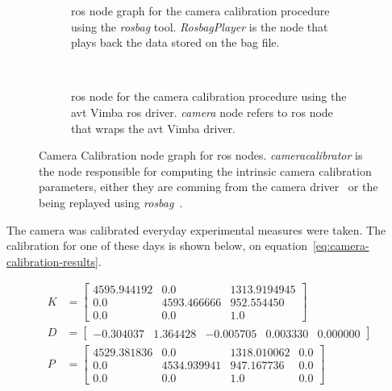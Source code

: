 \begin{figure}[H]
	\vspace{5mm}
	\centering
	\begin{subfigure}[c]{0.8\textwidth}
		\centering
		\def\svgwidth{\columnwidth}
		\graphicspath{{img/camera-calibration/}}
		
		\caption{\ac{ros} node graph for the camera calibration procedure using the \emph{rosbag} tool. \emph{RosbagPlayer} is the node that plays back the data stored on the bag file.}
		\label{fig:camera-calibration-bag-rosgraph}
	\end{subfigure}
	\vspace{5mm} \\ 
	\begin{subfigure}[c]{0.8\textwidth}
		\centering
		\def\svgwidth{\columnwidth}
		\graphicspath{{img/camera-calibration/}}
		
		\caption{\ac{ros} node for the camera calibration procedure using the \ac{avt} Vimba \ac{ros} driver. \emph{camera} node refers to \ac{ros} node that wraps the \ac{avt} Vimba driver.}
		\label{fig:camera-calibration-avt-rosgraph}
	\end{subfigure}
	\caption{Camera Calibration node graph for \ac{ros} nodes. \emph{cameracalibrator} is the node responsible for computing the intrinsic camera calibration parameters, either they are comming from the camera driver~ or the being replayed using \emph{rosbag}~.}
	\label{fig:camera-calibration-rosgraph}
\end{figure}

The camera was calibrated everyday experimental measures were taken. The calibration for one of these days is shown below, on equation~\ref{eq:camera-calibration-results}.

\begin{subequations}
	\label{eq:camera-calibration-results}
	\begin{align}
		K & = 
		\begin{bmatrix}
			4595.944192 & 0.0         &  1313.9194945 \\
			0.0         & 4593.466666 &  952.554450 \\
			0.0         & 0.0         &  1.0
		\end{bmatrix} \\
		D & = 
		\begin{bmatrix}
			-0.304037 & 1.364428 &  -0.005705 & 0.003330 & 0.000000
		\end{bmatrix} \\
		P & = 
		\begin{bmatrix}
			4529.381836 & 0.0         & 1318.010062 & 0.0 \\
			0.0         & 4534.939941 & 947.167736  & 0.0 \\
			0.0         & 0.0         & 1.0         & 0.0 
		\end{bmatrix}
	\end{align}
\end{subequations}

